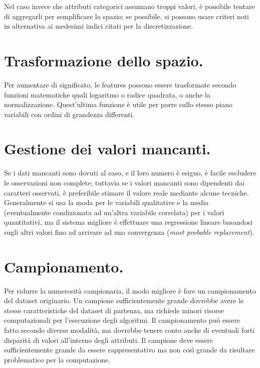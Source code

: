 \documentclass[11pt, a4page, twocolumn]{article}
\begin{document}
Nel caso invece che attributi categorici assumano troppi valori, è possibile tentare di aggregarli per semplificare lo spazio: se possibile, si possono usare criteri noti in alternativa ai medesimi indici citati per la discretizzazione.

\section{Trasformazione dello spazio.}
Per aumentare di significato, le features possono essere trasformate secondo funzioni matematiche quali logaritmo o radice quadrata, o anche la normalizzazione.
Quest'ultima funzione è utile per porre sullo stesso piano variabili con ordini di grandezza differenti.


\section{Gestione dei valori mancanti.}
Se i dati mancanti sono dovuti al caso, e il loro numero è esiguo, è facile escludere le osservazioni non complete; tuttavia se i valori mancanti sono dipendenti dai caratteri osservati, è preferibile stimare il valore reale mediante alcune tecniche.
Generalmente si usa la moda per le variabili qualitative e la media (eventualmente condizionata ad un'altra variabile correlata) per i valori quantitativi, ma il sistema migliore è effettuare una regressione lineare basandosi sugli altri valori fino ad arrivare ad una convergenza (\textit{most probable replacement}).


\section{Campionamento.}
Per ridurre la numerosità campionaria, il modo migliore è fare un campionamento del dataset originario.
Un campione sufficientemente grande dovrebbe avere le stesse caratteristiche del dataset di partenza, ma richiede minori risorse computazionali per l'esecuzione degli algoritmi.
Il campionamento può essere fatto secondo diverse modalità, ma dovrebbe tenere conto anche di eventuali forti disparità di valori all'interno degli attributi.
Il campione deve essere sufficientemente grande da essere rappresentativo ma non così grande da risultare problematico per la computazione.



\newpage
\end{document}

